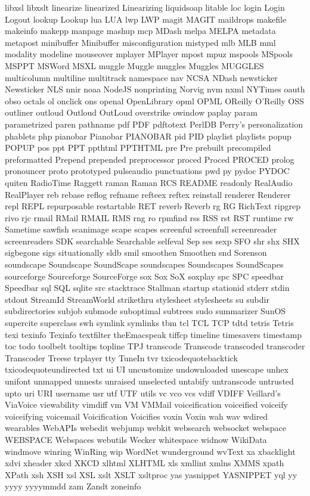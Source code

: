 libxsl
libxslt
linearize
linearized
Linearizing
liquidsoap
litable
loc
login
Login
Logout
lookup
Lookup
lua
LUA
lwp
LWP
magit
MAGIT
maildrops
makefile
makeinfo
makepp
manpage
mashup
mcp
MDash
melpa
MELPA
metadata
metapost
minibuffer
Minibuffer
misconfiguration
mistyped
mlb
MLB
mml
modality
modeline
mouseover
mplayer
MPlayer
mpost
mpuz
mspools
MSpools
MSPPT
MSWord
MSXL
muggle
Muggle
muggles
Muggles
MUGGLES
multicolumn
multiline
multitrack
namespace
nav
NCSA
NDash
newsticker
Newsticker
NLS
nnir
noaa
NodeJS
nonprinting
Norvig
nvm
nxml
NYTimes
oauth
obso
octals
ol
onclick
ons
openal
OpenLibrary
opml
OPML
OReilly
O'Reilly
OSS
outliner
outloud
Outloud
OutLoud
overstrike
owindow
paplay
param
parametrized
paren
pathname
pdf
PDF
pdftotext
PerlDB
Perry's
personalization
phablets
php
pianobar
Pianobar
PIANOBAR
pid
PID
playlist
playlists
popup
POPUP
pos
ppt
PPT
ppthtml
PPTHTML
pre
Pre
prebuilt
precompiled
preformatted
Prepend
prepended
preprocessor
proced
Proced
PROCED
prolog
pronouncer
proto
prototyped
pulseaudio
punctuations
pwd
py
pydoc
PYDOC
quiten
RadioTime
Raggett
raman
Raman
RCS
README
readonly
RealAudio
RealPlayer
reb
rebase
reflog
refname
refteex
reftex
reinstall
renderer
Renderer
repl
REPL
repurposable
restartable
RET
reverb
Reverb
rg
RG
RichText
ripgrep
rivo
rjc
rmail
RMail
RMAIL
RMS
rng
ro
rpmfind
rss
RSS
rst
RST
runtime
rw
Sametime
sawfish
scanimage
scape
scapes
screenful
screenfull
screenreader
screenreaders
SDK
searchable
Searchable
selfeval
Sep
ses
sexp
SFO
shr
shx
SHX
sigbegone
sigs
situationally
sldb
smil
smoothen
Smoothen
snd
Sorenson
soundscape
Soundscape
SoundScape
soundscapes
Soundscapes
SoundScapes
sourceforge
Sourceforge
SourceForge
sox
Sox
SoX
soxplay
spc
SPC
speedbar
Speedbar
sql
SQL
sqlite
src
stacktrace
Stallman
startup
stationid
stderr
stdin
stdout
StreamId
StreamWorld
strikethru
stylesheet
stylesheets
su
subdir
subdirectories
subjob
submode
suboptimal
subtrees
sudo
summarizer
SunOS
supercite
superclass
swh
symlink
symlinks
tbm
tcl
TCL
TCP
tdtd
tetris
Tetris
texi
texinfo
Texinfo
textfilter
theEmacspeak
tiffcp
timeline
timesavers
timestamp
toc
todo
toolbelt
tooltips
topline
TPJ
transcode
Transcode
transcoded
transcoder
Transcoder
Treese
trplayer
tty
TuneIn
tvr
txicodequotebacktick
txicodequoteundirected
txt
ui
UI
uncustomize
undownloaded
unescape
unhex
unifont
unmapped
unnests
unraised
unselected
untabify
untranscode
untrusted
upto
uri
URI
username
usr
utf
UTF
utils
vc
vco
vcs
vdiff
VDIFF
Veillard's
ViaVoice
viewability
vimdiff
vm
VM
VMMail
voiceification
voiceified
voiceify
voiceifying
voicemail
Voicification
Voicifies
voxin
Voxin
wah
wav
wdired
wearables
WebAPIs
webedit
webjump
webkit
websearch
websocket
webspace
WEBSPACE
Webspaces
webutils
Wecker
whitespace
widnow
WikiData
windmove
winring
WinRing
wip
WordNet
wunderground
wvText
xa
xbacklight
xdvi
xheader
xkcd
XKCD
xlhtml
XLHTML
xls
xmllint
xmlns
XMMS
xpath
XPath
xsh
XSH
xsl
XSL
xslt
XSLT
xsltproc
yas
yasnippet
YASNIPPET
yql
yy
yyyy
yyyymmdd
zam
Zandt
zoneinfo
